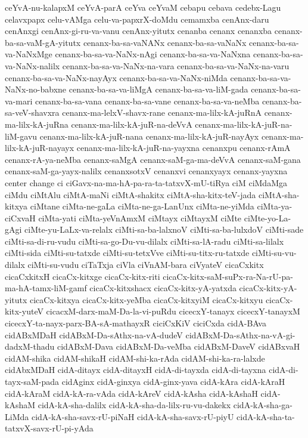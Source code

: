 {ceYvA-nu-kalapxM
ceYvA-parA
ceYva
ceYvaM
cebapu
cebava
cedebx-Lagu
celavxpapx
celu-vAMga
celu-va-papxrX-doMdu
cemamxba
cenAnx-daru
cenAnxgi
cenAnx-gi-ru-va-vanu
cenAnx-yitutx
cenanba
cenanx
cenanxba
cenanx-ba-sa-vaM-gA-yitutx
cenanx-ba-sa-vaNANx
cenanx-ba-sa-vaNaNx
cenanx-ba-sa-va-NaNxMge
cenanx-ba-sa-va-NaNx-nAgi
cenanx-ba-sa-va-NaNxna
cenanx-ba-sa-va-NaNx-nalilx
cenanx-ba-sa-va-NaNx-na-vara
cenanx-ba-sa-va-NaNx-na-varu
cenanx-ba-sa-va-NaNx-nayAyx
cenanx-ba-sa-va-NaNx-niMda
cenanx-ba-sa-va-NaNx-no-babxne
cenanx-ba-sa-va-liMgA
cenanx-ba-sa-va-liM-gada
cenanx-ba-sa-va-mari
cenanx-ba-sa-vana
cenanx-ba-sa-vane
cenanx-ba-sa-va-neMba
cenanx-ba-sa-veV-shavxra
cenanx-ma-lelxV-shavx-rane
cenanx-ma-lilx-kA-juRnA
cenanx-ma-lilx-kA-juRna
cenanx-ma-lilx-kA-juR-na-deVvA
cenanx-ma-lilx-kA-juR-na-liM-gavu
cenanx-ma-lilx-kA-juR-nana
cenanx-ma-lilx-kA-juR-nayAyx
cenanx-ma-lilx-kA-juR-nayayx
cenanx-ma-lilx-kA-juR-na-yayxna
cenanxpu
cenanx-rAmA
cenanx-rA-ya-neMba
cenanx-saMgA
cenanx-saM-ga-ma-deVvA
cenanx-saM-gana
cenanx-saM-ga-yayx-nalilx
cenanxsotxV
cenanxvi
cenanxyayx
cenanx-yayxna
center
change
ci
ciGavx-na-ma-hA-pa-ra-ta-tatxvX-mU-tiRya
ciM
ciMdaMga
ciMdu
ciMtAlu
ciMtA-maNi
ciMtA-shakitx
ciMtA-sha-kitx-teV-jada
ciMtA-sha-kitxya
ciMtane
ciMta-ne-gaLa
ciMta-ne-ga-LanUnx
ciMta-ne-yiMda
ciMta-ya-ciCxvaH
ciMta-yati
ciMta-yeVnAmxM
ciMtayx
ciMtayxM
ciMte
ciMte-yo-La-gAgi
ciMte-yu-LaLx-va-relalx
ciMti-sa-ba-lalxnoV
ciMti-sa-ba-lulxdoV
ciMti-sade
ciMti-sa-di-ru-vudu
ciMti-sa-go-Du-vu-dilalx
ciMti-sa-lA-radu
ciMti-sa-lilalx
ciMti-sida
ciMti-su-tatxde
ciMti-su-tetxVve
ciMti-su-titx-ru-tatxde
ciMti-su-vu-dilalx
ciMti-su-vudu
ciTaTxja
ciVla
ciVnAM-bara
ciVyateV
cicaCxkitx
cicaCxkitxH
cicaCx-kitxge
cicaCx-kitx-riti
cicaCx-kitx-saM-suPx-ra-Na-rU-pa-ma-hA-tamx-liM-gamf
cicaCx-kitxshacx
cicaCx-kitx-yA-yatxda
cicaCx-kitx-yA-yitutx
cicaCx-kitxya
cicaCx-kitx-yeMba
cicaCx-kitxyiM
cicaCx-kitxyu
cicaCx-kitx-yuteV
cicacxM-darx-maM-Da-la-vi-puRdu
cicecxY-tanayx
cicecxY-tanayxM
cicecxY-ta-nayx-parx-BA-sA-mathayxR
ciciCxKiV
ciciCxda
cidA-BAva
cidABxMDaH
cidABxM-Da-sAthx-na-vA-dudeV
cidABxM-Da-sAthx-na-vA-gi-dadxM-thadu
cidABxM-Dava
cidABxM-Da-veMba
cidABxM-DaveV
cidABxvaH
cidAM-shika
cidAM-shikaH
cidAM-shi-ka-rAda
cidAM-shi-ka-ra-lalxde
cidAbxMDaH
cidA-ditayx
cidA-ditayxH
cidA-di-tayxda
cidA-di-tayxna
cidA-di-tayx-saM-pada
cidAginx
cidA-ginxya
cidA-ginx-yava
cidA-kAra
cidA-kAraH
cidA-kAraM
cidA-kA-ra-vAda
cidA-kAreV
cidA-kAsha
cidA-kAshaH
cidA-kAshaM
cidA-kA-sha-dalilx
cidA-kA-sha-da-lilx-ru-vu-dakekx
cidA-kA-sha-ga-LiMda
cidA-kA-sha-savx-rU-piNaH
cidA-kA-sha-savx-rU-piyU
cidA-kA-sha-ta-tatxvX-savx-rU-pi-yAda
}
